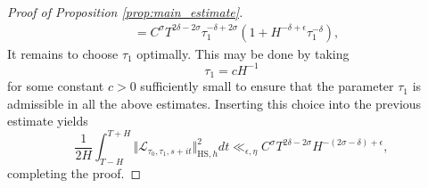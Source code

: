 \documentclass[10pt,a4paper]{amsart}
\begin{document}
\begin{proof}[Proof of Proposition \ref{prop:main_estimate}]
\begin{align*}
&= C^\sigma T^{2\delta-2 \sigma} \tau_1^{-\delta + 2\sigma} \left( 1 + H^{-\delta+\epsilon}  \tau_1^{-\delta} \right),
\end{align*}
It remains to choose $\tau_1$ optimally. This may be done by taking 
$$
\tau_1 = c H^{-1}
$$
for some constant $c>0$ sufficiently small to ensure that the parameter $\tau_1$ is admissible in all the above estimates. Inserting this choice into the previous estimate yields
$$
\frac{1}{2H} \int_{T-H}^{T+H} \Vert \mathcal{L}_{\tau_0, \tau_1, s+it} \Vert_{\mathrm{HS},h}^2 dt \ll_{\epsilon, \eta} C^\sigma T^{2\delta-2 \sigma} H^{-(2\sigma-\delta)+\epsilon},
$$
completing the proof.
\end{proof}
\end{document}
